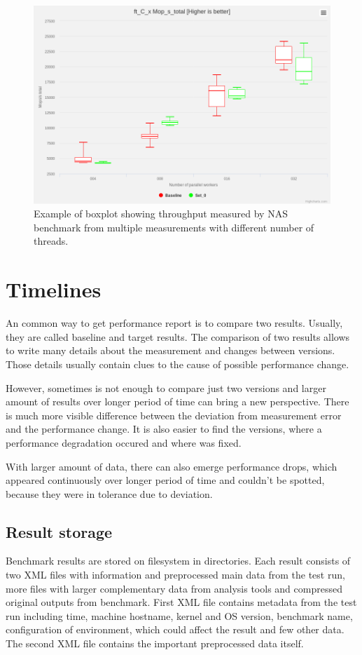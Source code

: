 \begin{figure}
  \centering
  \includegraphics[width=12cm]{obrazky-figures/boxplot}
  \caption{Example of boxplot showing throughput measured by NAS benchmark from
    multiple measurements with different number of threads.}
  \label{fig:boxplot}
\end{figure}


\chapter{Timelines}
An common way to get performance report is to compare two results. Usually, they
are called baseline and target results. The comparison of two results allows to
write many details about the measurement and changes between versions. Those
details usually contain clues to the cause of possible performance change.

However, sometimes is not enough to compare just two versions and larger amount
of results over longer period of time can bring a new perspective. There is much
more visible difference between the deviation from measurement error and the
performance change. It is also easier to find the versions, where a
performance degradation occured and where was fixed.

With larger amount of data, there can also emerge performance drops, which
appeared continuously over longer period of time and couldn't be spotted,
because they were in tolerance due to deviation.

\section{Result storage}
Benchmark results are stored on filesystem in directories. Each result consists
of two XML files with information and preprocessed main data from the test run,
more files with larger complementary data from analysis tools and compressed
original outputs from benchmark. First XML file contains metadata from the test
run including time, machine hostname, kernel and OS version, benchmark name,
configuration of environment, which could affect the result and few other data.
The second XML file contains the important preprocessed data itself.

